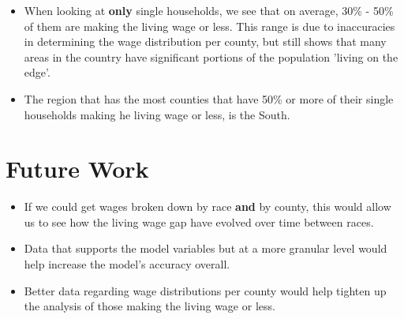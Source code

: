 \begin{itemize}
\item When looking at \textbf{only} single households, we see that on average, 30\% - 50\% of them are making the living wage or less. This range is due to inaccuracies in determining the wage distribution per county, but still shows that many areas in the country have significant portions of the population 'living on the edge'.

\item The region that has the most counties that have 50\% or more of their single households making he living wage or less, is the South.

\end{itemize}



\section{Future Work}

\begin{itemize}
\item If we could get wages broken down by race \textbf{and} by county, this would allow us to see how the living wage gap have evolved over time between races. 

\item Data that supports the model variables but at a more granular level would help increase the model's accuracy overall.

\item Better data regarding wage distributions per county would help tighten up the analysis of those making the living wage or less.

\end{itemize}